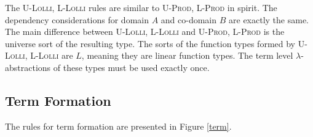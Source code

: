 \documentclass[sigplan,screen,review,authordraft]{acmart}
\theoremstyle{definition}
\newcommand{\rname}[1]{\textsc{\footnotesize #1}}
\begin{document}
  The \rname{U-Lolli}, \rname{L-Lolli} rules are similar to \rname{U-Prod}, \rname{L-Prod} in spirit. The dependency considerations for domain $A$ and co-domain $B$ are exactly the same. The main difference between \rname{U-Lolli}, \rname{L-Lolli} and \rname{U-Prod}, \rname{L-Prod} is the universe sort of the resulting type. The sorts of the function types formed by \rname{U-Lolli}, \rname{L-Lolli} are $L$, meaning they are linear function types. The term level $\lambda$-abstractions of these types must be used exactly once.

  \subsection{Term Formation} \label{teformation}
  The rules for term formation are presented in Figure \ref{term}.
\end{document}
